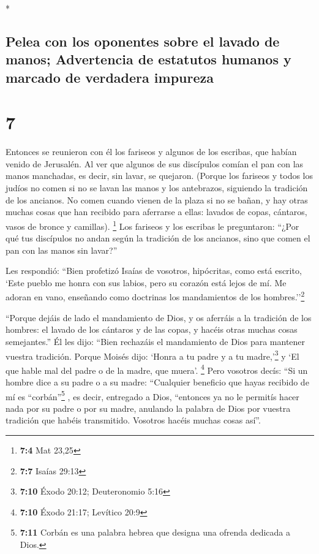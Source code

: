 \begin{paracol}{2}
\begin{otherlanguage}{english}
\end{otherlanguage}

\switchcolumn[0]*

\hypertarget{pelea-con-los-oponentes-sobre-el-lavado-de-manos-advertencia-de-estatutos-humanos-y-marcado-de-verdadera-impureza}{%
\subsection{Pelea con los oponentes sobre el lavado de manos;
Advertencia de estatutos humanos y marcado de verdadera
impureza}\label{pelea-con-los-oponentes-sobre-el-lavado-de-manos-advertencia-de-estatutos-humanos-y-marcado-de-verdadera-impureza}}

\hypertarget{section-12}{%
\section{7}\label{section-12}}

 Entonces se reunieron con él los fariseos y algunos de
los escribas, que habían venido de Jerusalén.  Al ver que
algunos de sus discípulos comían el pan con las manos manchadas, es
decir, sin lavar, se quejaron.  (Porque los fariseos y
todos los judíos no comen si no se lavan las manos y los antebrazos,
siguiendo la tradición de los ancianos.  No comen cuando
vienen de la plaza si no se bañan, y hay otras muchas cosas que han
recibido para aferrarse a ellas: lavados de copas, cántaros, vasos de
bronce y camillas). \footnote{\textbf{7:4} Mat 23,25}  Los
fariseos y los escribas le preguntaron: ``¿Por qué tus discípulos no
andan según la tradición de los ancianos, sino que comen el pan con las
manos sin lavar?''

 Les respondió: ``Bien profetizó Isaías de vosotros,
hipócritas, como está escrito, `Este pueblo me honra con sus labios,
pero su corazón está lejos de mí.  Me adoran en vano,
enseñando como doctrinas los mandamientos de los hombres.''\footnote{\textbf{7:7}
  Isaías 29:13}

 ``Porque dejáis de lado el mandamiento de Dios, y os
aferráis a la tradición de los hombres: el lavado de los cántaros y de
las copas, y hacéis otras muchas cosas semejantes.''  Él
les dijo: ``Bien rechazáis el mandamiento de Dios para mantener vuestra
tradición.  Porque Moisés dijo: `Honra a tu padre y a tu
madre,'\footnote{\textbf{7:10} Éxodo 20:12; Deuteronomio 5:16} y `El que
hable mal del padre o de la madre, que muera'. \footnote{\textbf{7:10}
  Éxodo 21:17; Levítico 20:9}  Pero vosotros decís: ``Si
un hombre dice a su padre o a su madre: ``Cualquier beneficio que hayas
recibido de mí es ``corbán''\footnote{\textbf{7:11} Corbán es una
  palabra hebrea que designa una ofrenda dedicada a Dios.} , es decir,
entregado a Dios,  ``entonces ya no le permitís hacer
nada por su padre o por su madre,  anulando la palabra de
Dios por vuestra tradición que habéis transmitido. Vosotros hacéis
muchas cosas así''.


\end{paracol}
